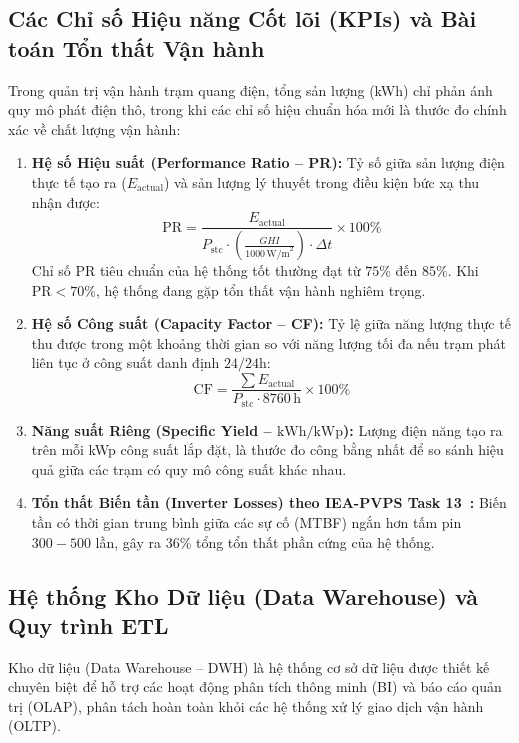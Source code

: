 \documentclass[12pt, a4paper]{report}
\begin{document}
\subsection{Các Chỉ số Hiệu năng Cốt lõi (KPIs) và Bài toán Tổn thất Vận hành}
Trong quản trị vận hành trạm quang điện, tổng sản lượng (kWh) chỉ phản ánh quy mô phát điện thô, trong khi các chỉ số hiệu chuẩn hóa mới là thước đo chính xác về chất lượng vận hành:
\begin{enumerate}[label=\arabic*., leftmargin=*]
    \item \textbf{Hệ số Hiệu suất (Performance Ratio -- PR):} Tỷ số giữa sản lượng điện thực tế tạo ra ($E_{\text{actual}}$) và sản lượng lý thuyết trong điều kiện bức xạ thu nhận được:
    \begin{equation}
        \text{PR} = \frac{E_{\text{actual}}}{P_{\text{stc}} \cdot \left(\frac{GHI}{1000\,\text{W/m}^2}\right) \cdot \Delta t} \times 100\%
    \end{equation}
    Chỉ số PR tiêu chuẩn của hệ thống tốt thường đạt từ $75\%$ đến $85\%$. Khi $\text{PR} < 70\%$, hệ thống đang gặp tổn thất vận hành nghiêm trọng.
    
    \item \textbf{Hệ số Công suất (Capacity Factor -- CF):} Tỷ lệ giữa năng lượng thực tế thu được trong một khoảng thời gian so với năng lượng tối đa nếu trạm phát liên tục ở công suất danh định $24/24\text{h}$:
    \begin{equation}
        \text{CF} = \frac{\sum E_{\text{actual}}}{P_{\text{stc}} \cdot 8760\,\text{h}} \times 100\%
    \end{equation}
    
    \item \textbf{Năng suất Riêng (Specific Yield -- $\text{kWh/kWp}$):} Lượng điện năng tạo ra trên mỗi kWp công suất lắp đặt, là thước đo công bằng nhất để so sánh hiệu quả giữa các trạm có quy mô công suất khác nhau.

    \item \textbf{Tổn thất Biến tần (Inverter Losses) theo IEA-PVPS Task 13~\cite{iea2023pvps}:} Biến tần có thời gian trung bình giữa các sự cố (MTBF) ngắn hơn tấm pin $300-500$ lần, gây ra 36\% tổng tổn thất phần cứng của hệ thống.
\end{enumerate}

\subsection{Hệ thống Kho Dữ liệu (Data Warehouse) và Quy trình ETL}
Kho dữ liệu (Data Warehouse -- DWH) là hệ thống cơ sở dữ liệu được thiết kế chuyên biệt để hỗ trợ các hoạt động phân tích thông minh (BI) và báo cáo quản trị (OLAP), phân tách hoàn toàn khỏi các hệ thống xử lý giao dịch vận hành (OLTP).
\end{document}
